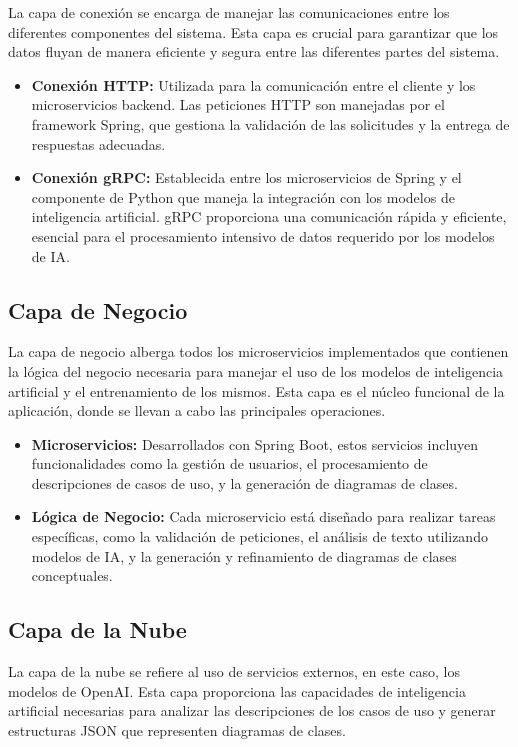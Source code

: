 La capa de conexión se encarga de manejar las comunicaciones entre los diferentes componentes del sistema. Esta capa es crucial para garantizar que los datos fluyan de manera eficiente y segura entre las diferentes partes del sistema.

\begin{itemize}
	\item \textbf{Conexión HTTP:} Utilizada para la comunicación entre el cliente y los microservicios backend. Las peticiones HTTP son manejadas por el framework Spring, que gestiona la validación de las solicitudes y la entrega de respuestas adecuadas.
	\item \textbf{Conexión gRPC:} Establecida entre los microservicios de Spring y el componente de Python que maneja la integración con los modelos de inteligencia artificial. gRPC proporciona una comunicación rápida y eficiente, esencial para el procesamiento intensivo de datos requerido por los modelos de IA.
\end{itemize}

\subsection{Capa de Negocio}

La capa de negocio alberga todos los microservicios implementados que contienen la lógica del negocio necesaria para manejar el uso de los modelos de inteligencia artificial y el entrenamiento de los mismos. Esta capa es el núcleo funcional de la aplicación, donde se llevan a cabo las principales operaciones.

\begin{itemize}
	\item \textbf{Microservicios:} Desarrollados con Spring Boot, estos servicios incluyen funcionalidades como la gestión de usuarios, el procesamiento de descripciones de casos de uso, y la generación de diagramas de clases.
	\item \textbf{Lógica de Negocio:} Cada microservicio está diseñado para realizar tareas específicas, como la validación de peticiones, el análisis de texto utilizando modelos de IA, y la generación y refinamiento de diagramas de clases conceptuales.
\end{itemize}

\subsection{Capa de la Nube}

La capa de la nube se refiere al uso de servicios externos, en este caso, los modelos de OpenAI. Esta capa proporciona las capacidades de inteligencia artificial necesarias para analizar las descripciones de los casos de uso y generar estructuras JSON que representen diagramas de clases.

